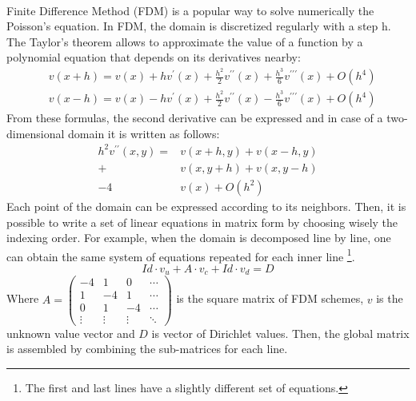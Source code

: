 \begin{refsection}
	\paragraph{}
	Finite Difference Method (FDM) is a popular way to solve numerically the Poisson’s equation. In FDM, the domain is discretized regularly with a step h. The Taylor's theorem allows to approximate the value of a function by a polynomial equation that depends on its derivatives nearby:
	\begin{align}
		 & v(x+h) = v(x)+hv^{\prime}(x)
		+\frac{h^2}{2}v^{\prime\prime}(x)+\frac{h^3}{6}v^{\prime\prime\prime}(x) + O(h^{4}) \\
		 & v(x-h) = v(x)-hv^{\prime}(x)
		+\frac{h^2}{2}v^{\prime\prime}(x)-\frac{h^3}{6}v^{\prime\prime\prime}(x) + O(h^{4})
	\end{align}
	From these formulas, the second derivative can be expressed and in case of a two-dimensional domain it is written as follows:
	\begin{equation}
		\begin{split}
			h^{2}v^{\prime\prime}(x,y)=&v(x+h,y) + v(x-h,y) \\
			+ &v(x,y+h) + v(x,y-h) \\
			- 4&v(x)+ O(h^{2})
		\end{split}
	\end{equation}
	Each point of the domain can be expressed according to its neighbors. Then, it is possible to write a set of linear equations in matrix form by choosing wisely the indexing order. For example, when the domain is decomposed line by line, one can obtain the same system of equations repeated for each inner line \footnote{The first and last lines have a slightly different set of equations.}.
	\begin{equation}
		Id \cdot v_{u} + A \cdot v_{c} + Id \cdot v_{d} = D
	\end{equation}
	Where $ A =
		\begin{pmatrix}
			-4     & 1      & 0      & \cdots \\
			1      & -4     & 1      & \cdots \\
			0      & 1      & -4     & \cdots \\
			\vdots & \vdots & \vdots & \ddots
		\end{pmatrix} $ is the square matrix of FDM schemes, $v$ is the unknown value vector and $D$ is vector of Dirichlet values. Then, the global matrix is assembled by combining the sub-matrices for each line.
	\begin{equation}

\end{equation}
\end{refsection}
